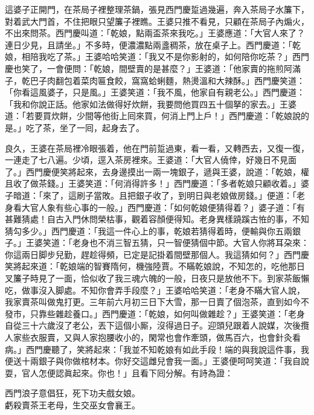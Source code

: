 這婆子正開門，在茶局子裡整理茶鍋，張見西門慶踅過幾遍，奔入茶局子水簾下，對着武大門首，不住把眼只望簾子裡瞧。王婆只推不看見，{}只顧在茶局子內煽火，不出來問茶。西門慶叫道：「乾娘，點兩盃茶來我吃。」王婆應道：「大官人來了？連日少見，{}且請坐。」不多時，便濃濃點兩盞稠茶，放在桌子上。西門慶道：「乾娘，相陪我吃了茶。」王婆哈哈笑道：「我又不是你影射的，如何陪你吃茶？」西門慶也笑了，一會便問：「乾娘，間壁賣的是甚麼？」王婆道：「他家賣的拖煎阿滿子，乾巴子肉翻包着菜肉匾食餃，窩窩蛤蜊麵，熱燙溫和大辣酥。」{}西門慶笑道：「你看這風婆子，只是風。」王婆笑道：「我不風，他家自有親老公。」{}西門慶道：「我和你說正話。他家如法做得好炊餅，我要問他買四五十個拏的家去。」王婆道：「若要買炊餅，少間等他街上囘來買，何消上門上戶！」西門慶道：「乾娘說的是。」吃了茶，坐了一囘，起身去了。

良久，王婆在茶局裡冷眼張着，他在門前踅過東，看一看，又轉西去，又復一復，一連走了七八遍。少頃，逕入茶房裡來。王婆道：「大官人僥倖，好幾日不見面了。」{}西門慶便笑將起來，去身邊摸出一兩一塊銀子，遞與王婆，說道：「乾娘，權且收了做茶錢。」王婆笑道：「何消得許多！」西門慶道：「多者乾娘只顧收着。」婆子暗道：「來了，這刷子當敗。且把銀子收了，到明日與老娘做房錢。」便道：「老身看大官人象有些心事的一般。」{}西門慶道：「如何乾娘便猜得着？」婆子道：「有甚難猜處！自古入門休問榮枯事，觀着容顏便得知。老身異樣蹺蹊古恠的事，不知猜勾多少。」西門慶道：「我這一件心上的事，乾娘若猜得着時，便輸與你五兩銀子。」王婆笑道：「老身也不消三智五猜，只一智便猜個中節。大官人你將耳朶來：你這兩日脚步兒勤，趕趁得頻，已定是記掛着間壁那個人。我這猜如何？」西門慶笑將起來道：「乾娘端的智賽隋何，機強陸賈。不瞞乾娘說，不知怎的，吃他那日叉簾子時見了一面，恰似收了我三魂六魄的一般，日夜只是放他不下。到家茶飯懶吃，做事沒入脚處。不知你會弄手段麼？」王婆哈哈笑道：「老身不瞞大官人說，我家賣茶叫做鬼打更。三年前六月初三日下大雪，那一日賣了個泡茶，直到如今不發市，只靠些雜趁養口。」西門慶道：「乾娘，如何叫做雜趁？」王婆笑道：「老身自從三十六歲沒了老公，丟下這個小厮，沒得過日子。迎頭兒跟着人說媒，次後攬人家些衣服賣，又與人家抱腰收小的，閑常也會作牽頭，做馬百六，也會針灸看病。」{}西門慶聽了，笑將起來：「我並不知乾娘有如此手段！端的與我說這件事，我便送十兩銀子與你做棺材本。你好交這雌兒會我一面。」王婆便呵呵笑道：「我自說耍，官人怎便認眞起來。你也！」且看下囘分解。有詩為證：

\begin{myquote}
西門浪子意倡狂，死下功夫戲女娘。\\虧殺賣茶王老母，生交巫女會襄王。
\end{myquote}

